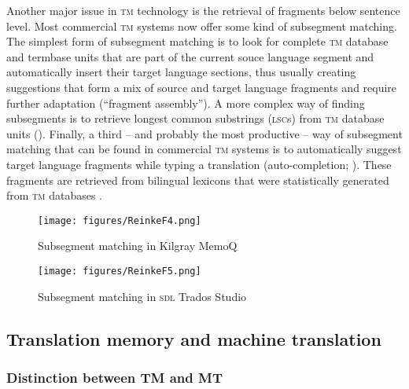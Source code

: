 \documentclass[output=paper]{LSP/langsci}
\begin{document}
Another major issue in \textsc{tm} technology is the retrieval of fragments below sentence level. Most commercial \textsc{tm} systems now offer some kind of subsegment matching. The simplest form of subsegment matching is to look for complete \textsc{tm} database and termbase units that are part of the current souce language segment and automatically insert their target language sections, thus usually creating suggestions that form a mix of source and target language fragments and require further adaptation (``fragment assembly''). A more complex way of finding subsegments is to retrieve longest common substrings (\textsc{lsc}s) from \textsc{tm} database units (). Finally, a third -- and probably the most productive -- way of subsegment matching that can be found in commercial \textsc{tm} systems is to automatically suggest target language fragments while typing a translation (auto-completion; ). These fragments are retrieved from bilingual lexicons that were statistically generated from \textsc{tm} databases \citep{Chama2010}.

\begin{figure}
\texttt{[image: figures/ReinkeF4.png]}
\caption{Subsegment matching in Kilgray MemoQ}
\label{fig:reinke:4}
\end{figure}

\begin{figure}
\texttt{[image: figures/ReinkeF5.png]}
\caption{Subsegment matching in \textsc{sdl} Trados Studio }
\label{fig:reinke:5}
\end{figure}

\subsection{Translation memory and machine translation}\label{sec:reinke:2.4}
\subsubsection{Distinction between TM and MT}\label{2.4.1}
\end{document}
